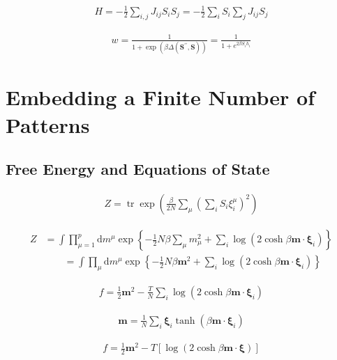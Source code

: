 \documentclass{article}
\begin{document}
\begin{align*}
H = -\frac{1}{2} \sum_{i,j} J_{ij} S_i S_j = -\frac{1}{2} \sum_i S_i \sum_j J_{ij} S_j
\tag{7.7}
\end{align*}

\begin{align*}
w = \frac{1}{1 + \exp\left( \beta \Delta \left( \mathbf{S}^{\prime\prime}, \mathbf{S} \right) \right)} = \frac{1}{1 + e^{2 \beta S_i h_i}}
\tag{7.8}
\end{align*}

\clearpage

\section{Embedding a Finite Number of Patterns}

\subsection{Free Energy and Equations of State}

\begin{align*}
Z = \operatorname{tr} \exp \left( \frac{\beta}{2N} \sum_{\mu} \left( \sum_i S_i \xi_i^{\mu} \right)^2 \right)
\tag{7.9}
\end{align*}

\begin{align*}
Z &= \int \prod_{\mu=1}^{p} \mathrm{d} m^{\mu} \exp \left\{ -\frac{1}{2} N \beta \sum_{\mu} m_{\mu}^2 + \sum_i \log \left( 2 \cosh \beta \mathbf{m} \cdot \boldsymbol{\xi}_i \right) \right\} \\
& \qquad =\int \prod_{\mu} \mathrm{d} m^{\mu} \exp \left\{-\frac{1}{2} N \beta \mathbf{m}^{2}+\sum_{i} \log \left(2 \cosh \beta \mathbf{m} \cdot \boldsymbol{\xi}_{i}\right)\right\}
\tag{7.10}
\end{align*}

\begin{align*}
f = \frac{1}{2} \mathbf{m}^2 - \frac{T}{N} \sum_i \log \left( 2 \cosh \beta \mathbf{m} \cdot \boldsymbol{\xi}_i \right)
\tag{7.11}
\end{align*}

\begin{align*}
\mathbf{m} = \frac{1}{N} \sum_i \boldsymbol{\xi}_i \tanh \left( \beta \mathbf{m} \cdot \boldsymbol{\xi}_i \right)
\tag{7.12}
\end{align*}

\begin{align*}
f = \frac{1}{2} \mathbf{m}^2 - T \left[ \log \left( 2 \cosh \beta \mathbf{m} \cdot \boldsymbol{\xi} \right) \right]\tag{7.13}
\end{align*}
\end{document}
